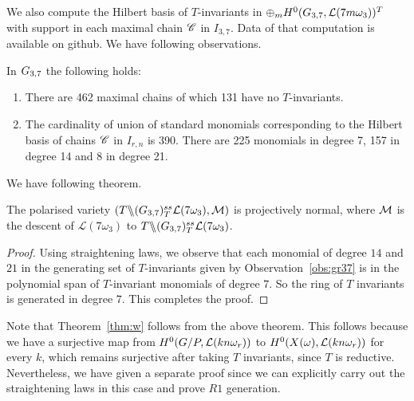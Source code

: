 We also compute the Hilbert basis of $T$-invariants in $\oplus_m H^0(G_{{3},{7}}, {\cal L}(7m\omega_3))^T$ with support in each maximal chain $\mathscr{C}$ in $I_{3,7}$.
Data of that computation is available on github. We have following observations. 
\begin{observation}
\label{obs:gr37}
In $G_{{3},{7}}$ the following holds:
\begin{enumerate}
\item There are 462 maximal chains of which 131 have no $T$-invariants.
\item The cardinality of union of standard monomials corresponding to the Hilbert basis of chains $\mathscr{C}$ in $I_{r,n}$ is 390. There are 225 monomials in degree 7, 157 in degree 14 and 8 in degree 21.
\end{enumerate}
\end{observation}
  We have following theorem. 
\begin{theorem}
    The polarised variety \((T \backslash\mkern-6mu\backslash (G_{{3},{7}})^{ss}_T{\cal L}(7\omega_3),{\cal M})\) is projectively normal, where \(\cal M\) is the descent of \({\mathcal L}(7\omega_3)\) to \(T \backslash\mkern-6mu\backslash (G_{{3},{7}})^{ss}_T{\cal L}(7\omega_3)\).
\end{theorem}
\begin{proof}
Using straightening laws, we observe that each monomial of degree \(14\) and \(21\) in the generating set of $T$-invariants given by Observation~\ref{obs:gr37} is in the polynomial span of  $T$-invariant monomials  of degree \(7\). So the ring of $T$ invariants is generated in degree $7$. This completes the proof.
\end{proof}

Note that Theorem~\ref{thm:w} follows from the above theorem. This follows because we have a surjective map from $H^0(G/P, {\cal L}(kn\omega_r))$ to 
$H^0(X(\omega), {\cal L}(kn\omega_r))$ for every $k$, which remains surjective after taking $T$ invariants, since $T$ is reductive. Nevertheless, we have given a separate proof since 
we can explicitly carry out the straightening laws in this case and prove $R1$ generation.
 
